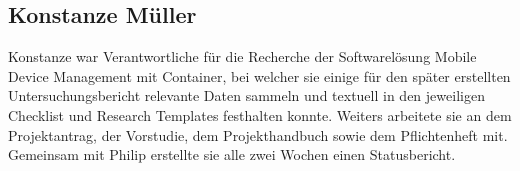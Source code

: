 \subsection{Konstanze Müller}
Konstanze war Verantwortliche für die Recherche der Softwarelösung Mobile Device Management mit Container, bei welcher sie einige für den später erstellten Untersuchungsbericht relevante Daten sammeln und textuell in den jeweiligen Checklist und Research Templates festhalten konnte. Weiters arbeitete sie an dem Projektantrag, der Vorstudie, dem Projekthandbuch sowie dem Pflichtenheft mit. Gemeinsam mit Philip erstellte sie alle zwei Wochen einen Statusbericht.

